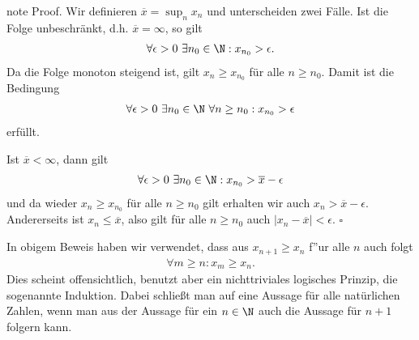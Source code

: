 \documentclass[letterpaper,10pt,english]{jupyterBook}
\begin{document}
\begin{sphinxadmonition}{note}
Proof. Wir definieren \(\overline{x}= \sup_n x_n\) und unterscheiden zwei Fälle. Ist die Folge unbeschränkt, d.h. \(\overline{x}=\infty\), so gilt
\begin{equation*}
\begin{split} \forall \epsilon > 0~\exists n_0 \in \N: x_{n_0} > \epsilon. \end{split}
\end{equation*}
Da die Folge monoton steigend ist, gilt \(x_n \geq x_{n_0}\) für alle \(n \geq n_0\). Damit ist die Bedingung
\begin{equation*}
\begin{split} \forall \epsilon > 0~\exists n_0 \in \N~\forall n\geq n_0: x_{n_0} > \epsilon  \end{split}
\end{equation*}
erfüllt.

Ist \(\overline{x} < \infty\), dann gilt
\begin{equation*}
\begin{split} \forall \epsilon > 0~\exists n_0 \in \N: x_{n_0} > \overline{x} -\epsilon\end{split}
\end{equation*}
und da wieder \(x_n \geq x_{n_0}\) für alle \(n \geq n_0\) gilt erhalten wir auch \( x_n > \overline{x}-\epsilon\). Andererseits ist \(x_n \leq \overline{x}\), also gilt für alle \(n \geq n_0\) auch \( \vert x_n - \overline{x} \vert < \epsilon. \)  \(\square\)
\end{sphinxadmonition}

In obigem Beweis haben wir verwendet, dass aus \(x_{n+1} \geq x_n\) f”ur alle \(n\) auch folgt
\begin{equation*}
\begin{split} \forall m \geq n: x_m \geq x_n. \end{split}
\end{equation*}
Dies scheint offensichtlich, benutzt aber ein nichttriviales logisches Prinzip, die sogenannte Induktion. Dabei schließt man auf eine Aussage für alle natürlichen Zahlen, wenn man aus der Aussage für ein \(n \in \N\) auch die Aussage für \(n+1\) folgern kann.
\end{document}
